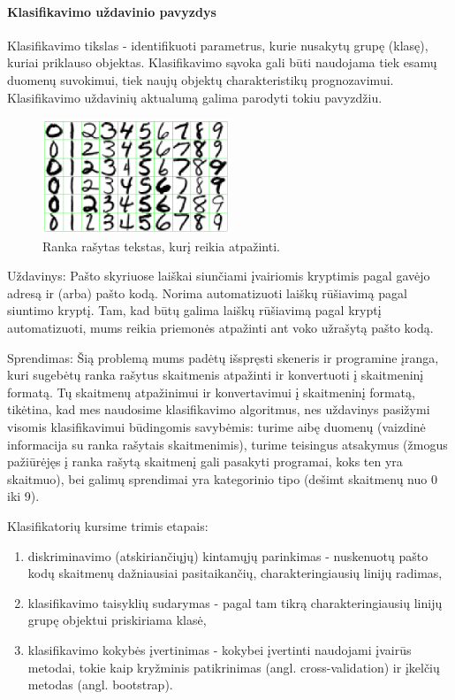 \paragraph{Klasifikavimo uždavinio pavyzdys}

Klasifikavimo tikslas - identifikuoti parametrus, kurie nusakytų grupę (klasę),
kuriai priklauso objektas. Klasifikavimo sąvoka gali būti naudojama tiek esamų
duomenų suvokimui, tiek naujų objektų charakteristikų prognozavimui.
Klasifikavimo uždavinių aktualumą galima parodyti tokiu pavyzdžiu.

\begin{figure}[htb]
\begin{center}
\leavevmode
\includegraphics[width=0.5\textwidth]{images/ranka_rasyti_skaiciai.png}
\end{center}
\caption{Ranka rašytas tekstas, kurį reikia atpažinti.}
\label{fig:flash}
\end{figure}

Uždavinys: Pašto skyriuose laiškai siunčiami įvairiomis kryptimis pagal gavėjo
adresą ir (arba) pašto kodą. Norima automatizuoti laiškų rūšiavimą pagal
siuntimo kryptį. Tam, kad būtų galima laiškų rūšiavimą pagal kryptį
automatizuoti, mums reikia priemonės atpažinti ant voko užrašytą
pašto kodą.

Sprendimas: Šią problemą mums padėtų išspręsti skeneris ir programine įranga,
kuri sugebėtų ranka rašytus skaitmenis atpažinti ir konvertuoti į skaitmeninį
formatą. Tų skaitmenų atpažinimui ir konvertavimui į skaitmeninį formatą,
tikėtina, kad mes naudosime klasifikavimo algoritmus, nes uždavinys pasižymi
visomis klasifikavimui būdingomis savybėmis: turime aibę duomenų (vaizdinė
informacija su ranka rašytais skaitmenimis), turime teisingus atsakymus (žmogus
pažiūrėjęs į ranka rašytą skaitmenį gali pasakyti programai, koks ten yra
skaitmuo), bei galimų sprendimai yra kategorinio tipo (dešimt skaitmenų nuo
0 iki 9).

Klasifikatorių kursime trimis etapais:
\begin{enumerate}
  \item diskriminavimo (atskiriančiųjų) kintamųjų parinkimas - nuskenuotų
  pašto kodų skaitmenų dažniausiai pasitaikančių, charakteringiausių linijų
  radimas,
  \item klasifikavimo taisyklių sudarymas - pagal tam tikrą charakteringiausių
  linijų grupę objektui priskiriama klasė,
  \item klasifikavimo kokybės įvertinimas - kokybei įvertinti naudojami įvairūs
  metodai, tokie kaip kryžminis patikrinimas (angl. cross-validation) ir
  įkelčių metodas (angl. bootstrap).
\end{enumerate}

